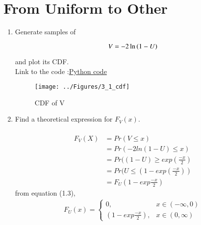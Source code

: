 \documentclass[journal,12pt,twocolumn]{IEEEtran}
\renewcommand\thesection{\arabic{section}}
\begin{document}
\section{From Uniform to Other}
\begin{enumerate}[label=\thesection.\arabic*
,ref=\thesection.\theenumi]

\item
Generate samples of 

\begin{equation}
V = -2\ln\left(1-U\right)
\end{equation}

and plot its CDF. \\
\solution Link to the code :\href{https://github.com/anikettsatpute/Probability-and-Random-Variable-Assignment/blob/main/code/code3_2.c}{Python code}
\begin{figure}[h]
\centering
\texttt{[image: ../Figures/3\_1\_cdf]}
\caption{CDF of V}
\label{fig:gauss_pdf}
\end{figure}

\item Find a theoretical expression for $F_V(x)$.\\
\solution \\
\begin{align*}
F_V(X) &= Pr(V \le x)\\
&= Pr(-2ln(1-U) \le x)\\
&= Pr((1-U) \ge exp(\frac{-x}{2})\\
&= Pr(U \le (1-exp(\frac{-x}{2}))\\
&= F_U(1-exp \frac{-x}{2})
\end{align*} 
from equation (1.3),
\begin{align*}
F_U(x) = 
\begin{cases}
0, & x \in (-\infty,0) \\
(1-exp \frac{-x}{2}), & x \in (0,\infty)
\end{cases}
\end{align*}
\end{enumerate}





\end{document}
